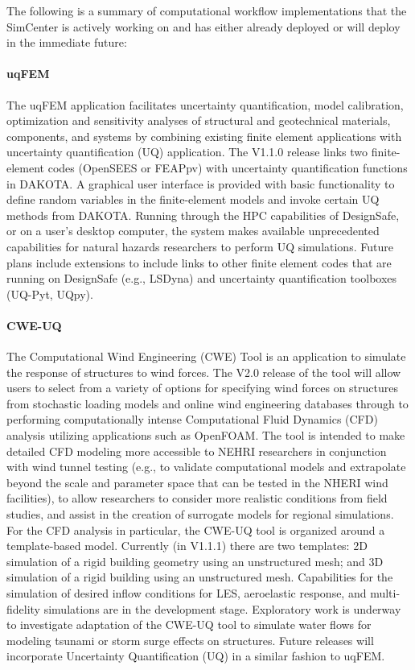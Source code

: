 The following is a summary of computational workflow implementations that the SimCenter is actively working on and has either already deployed or will deploy in the immediate future:

\paragraph{uqFEM} The uqFEM application facilitates uncertainty quantification, model calibration, optimization and sensitivity analyses of structural and geotechnical materials, components, and systems by combining existing finite element applications with uncertainty quantification (UQ) application. The V1.1.0 release links two finite-element codes (OpenSEES or FEAPpv) with uncertainty quantification functions in DAKOTA. A graphical user interface is provided with basic functionality to define random variables in the finite-element models and invoke certain UQ methods from DAKOTA. Running through the HPC capabilities of DesignSafe, or on a user’s desktop computer, the system makes available unprecedented capabilities for natural hazards researchers to perform UQ simulations. Future plans include extensions to include links to other finite element codes that are running on DesignSafe (e.g., LSDyna) and uncertainty quantification toolboxes (UQ-Pyt, UQpy).

\paragraph{CWE-UQ} The Computational Wind Engineering (CWE) Tool is an application to simulate the response of structures to wind forces. The V2.0 release of the tool will allow users to select from a variety of options for specifying wind forces on structures from stochastic loading models and online wind engineering databases through to performing computationally intense Computational Fluid Dynamics (CFD) analysis utilizing applications such as OpenFOAM. The tool is intended to make detailed CFD modeling more accessible to NEHRI researchers in conjunction with wind tunnel testing (e.g., to validate computational models and extrapolate beyond the scale and parameter space that can be tested in the NHERI wind facilities), to allow researchers to consider more realistic conditions from field studies, and assist in the creation of surrogate models for regional simulations. For the CFD analysis in particular, the CWE-UQ tool is organized around a template-based model. Currently (in V1.1.1) there are two templates: 2D simulation of a rigid building geometry using an unstructured mesh; and 3D simulation of a rigid building using an unstructured mesh. Capabilities for the simulation of desired inflow conditions for LES, aeroelastic response, and multi-fidelity simulations are in the development stage. 
Exploratory work is underway to investigate adaptation of the CWE-UQ tool to simulate water flows for modeling tsunami or storm surge effects on structures. Future releases will incorporate Uncertainty Quantification (UQ) in a similar fashion to uqFEM.

